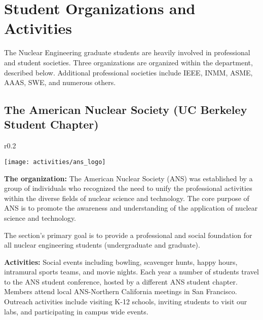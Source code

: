 
\vspace{1cm}
\section*{Student Organizations and Activities}

The Nuclear Engineering graduate students are heavily involved in professional and student societies. 
Three organizations are organized within the department, described below. Additional professional societies include IEEE, INMM, ASME, AAAS, SWE, and numerous others.

\subsection*{The American Nuclear Society (UC Berkeley Student Chapter)}
 
\begin{wrapfigure}{r}{0.2\textwidth}
	\begin{center}
		\vspace{-1.0cm}
		\texttt{[image: activities/ans\_logo]}
	\end{center}
\end{wrapfigure}

\textbf{The organization:} The American Nuclear Society (ANS) was established by a group of individuals who recognized the need to unify the professional activities within the diverse fields of nuclear science and technology. 
The core purpose of ANS is to promote the awareness and understanding of the application of nuclear science and technology.

The section’s primary goal is to provide a professional and social foundation for all nuclear engineering students (undergraduate and graduate).

\textbf{Activities:} Social events including bowling, scavenger hunts, happy hours, intramural sports teams, and movie nights. 
Each year a number of students travel to the ANS student conference, hosted by a different ANS student chapter. 
Members attend local ANS-Northern California meetings in San Francisco. 
Outreach activities include visiting K-12 schools, inviting students to visit our labs, and participating in campus wide events.

